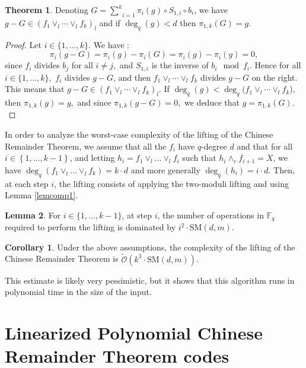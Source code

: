 \documentclass{article}
\newcommand{\Fq}{\mathbb{F}_q}
\newcommand{\SM}[2]{\text{SM}(#1,#2)}
\newcommand{\sO}{\tilde{\mathcal{O}}}
\theoremstyle{definition}
\newtheorem{theorem}{Theorem}
\newtheorem{lemma}[theorem]{Lemma}
\newtheorem{corollary}{Corollary}
\begin{document}
\begin{theorem} \label{CRT2}
      Denoting $G =  \underset{i = 1}{\overset{k}{\sum}} \pi_i
            (g) \circ S_{1,i} \circ b_i $, we have $g - G \in (f_1 \vee_l \cdots
            \vee_l f_k)_l$ and if $\deg_q (g) < d$ then $\pi_{1,k}(G) = g$.
\end{theorem}

\begin{proof}
      Let $i \in \{1, \dots, k \}.$ We have : \[ \pi_i(g -G)  = \pi_i(g)- \pi_i(G)=\pi_i(g) - \pi_i(g)  = 0,  \] since $f_i$ divides $b_j$ for all $i \neq j,$ and $S_{1,i} $ is the inverse of $b_i \mod f_i.$
      Hence for all $i \in \{1, \dots, k \},$ $f_i$ divides $g-G$, and then $f_1 \vee_l \cdots \vee_l f_k$ divides $g-G$ on the right. This means that $g-G \in(f_1 \vee_l \cdots \vee_l f_k)_l$.
      If $\deg_q(g) <\deg_q(f_1 \vee_l \cdots \vee_l f_k$), then $\pi_{1,k} (g)=g,$ and since $\pi_{1,k} (g-G)=0,$ we deduce that $g = \pi_{1,k}(G).$
\end{proof}


In order to analyze the worst-case complexity of the lifting of the Chinese Remainder Theorem,
we assume that all the $f_i$ have $q$-degree $d$ and that for all $i \in \left\{1,\dots,k-1\right\}$,  and letting
$h_i=f_1 \vee_l \dots \vee_l f_i$ such that $h_i \wedge_r f_{i+1}= X$, we have $\deg_q(f_1 \vee_l \dots \vee_l f_k)=k \cdot d$
and more generally $\deg_q(h_i)=i \cdot d$.  Then, at each step $i$, the lifting consists  of applying the two-moduli lifting and using Lemma \ref{lemcomp1}.

\begin{lemma}  \label{lemcomp2} For $i \in \{1,\dots, k-1\}$, at step $i$, the number of operations in $\Fq$ required to perform the lifting is
      dominated by $i^2 \cdot \SM{d}{m}$. \end{lemma}

\begin{corollary} \label{comptot}
      Under the above assumptions, the complexity of the lifting of the Chinese Remainder Theorem is $\sO(k^3 \cdot \SM{d}{m})$.
\end{corollary}
This estimate is likely very pessimistic, but it shows that this algorithm runs in polynomial time in the size of the input.
\color{black}

\section{Linearized Polynomial Chinese Remainder Theorem codes} \label{QPCRT}
\end{document}
